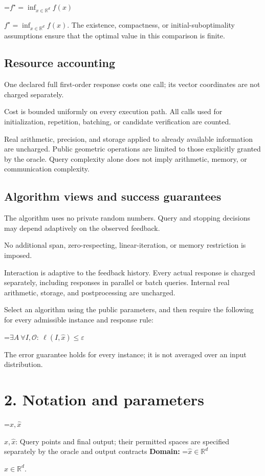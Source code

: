 \documentclass[10pt,a4paper]{article}
\newcommand{\AtlasMath}[1]{\par\begingroup\centering\setbox0=\hbox{$\displaystyle #1$}\ifdim\wd0>1.4\linewidth\typeout{ATLAS WIDE FORMULA: \the\wd0}\fi\ifdim\wd0>\linewidth\resizebox{\linewidth}{!}{\box0}\else\box0\fi\par\endgroup}
\newcommand{\AtlasInlineMath}[1]{\begingroup\setbox0=\hbox{$#1$}\ifdim\wd0>.4\linewidth\endgroup\AtlasMath{#1}\else\endgroup$#1$\fi}
\begin{document}
\AtlasInlineMath{f^\star=\inf_{x\in \mathbb{R}^d}f(x)}. The existence, compactness, or initial-suboptimality assumptions ensure that the optimal value in this comparison is finite.

\subsection{Resource accounting}
One declared full first-order response costs one call; its vector coordinates are not charged separately.

Cost is bounded uniformly on every execution path. All calls used for initialization, repetition, batching, or candidate verification are counted.

Real arithmetic, precision, and storage applied to already available information are uncharged. Public geometric operations are limited to those explicitly granted by the oracle. Query complexity alone does not imply arithmetic, memory, or communication complexity.

\subsection{Algorithm views and success guarantees}
The algorithm uses no private random numbers. Query and stopping decisions may depend adaptively on the observed feedback.

No additional span, zero-respecting, linear-iteration, or memory restriction is imposed.

Interaction is adaptive to the feedback history. Every actual response is charged separately, including responses in parallel or batch queries. Internal real arithmetic, storage, and postprocessing are uncharged.

Select an algorithm using the public parameters, and then require the following for every admissible instance and response rule:


\AtlasMath{\exists A\ \forall I,\mathcal{O}:\ \ell(I,\widehat{x})\le\varepsilon}


The error guarantee holds for every instance; it is not averaged over an input distribution.

\section{2. Notation and parameters}
\AtlasInlineMath{x,\widehat{x}}: Query points and final output; their permitted spaces are specified separately by the oracle and output contracts \textbf{Domain:} \AtlasInlineMath{\widehat{x}\in \mathbb{R}^d}.
\end{document}
